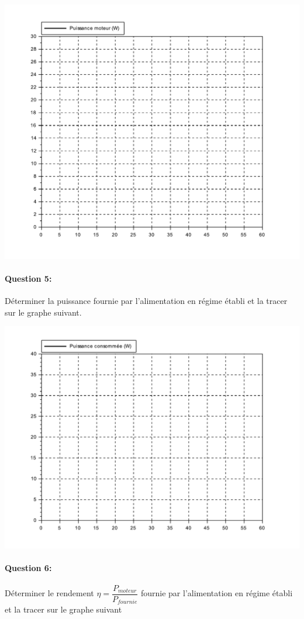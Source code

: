 \begin{center}
 \includegraphics[width=0.8\linewidth]{img/Puissance_moteur_vide}
\end{center}

\paragraph{Question 5:} Déterminer la puissance fournie par l'alimentation en régime établi et la tracer sur le graphe suivant.

\begin{center}
 \includegraphics[width=0.8\linewidth]{img/Puissance_conso_vide}
\end{center}

\paragraph{Question 6:} Déterminer le rendement $\eta=\dfrac{P_{moteur}}{P_{fournie}}$ fournie par l'alimentation en régime établi et la tracer sur le graphe suivant

